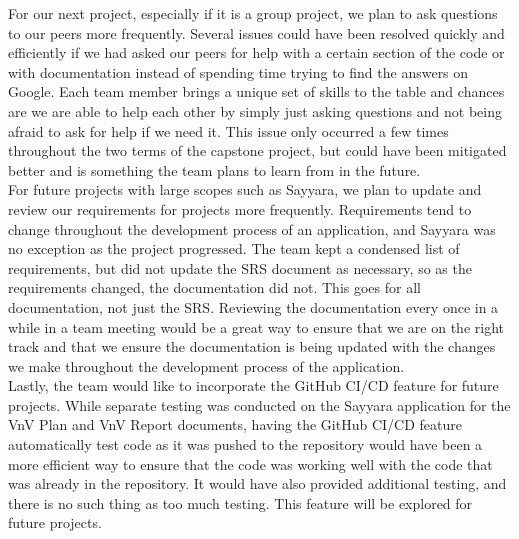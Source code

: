 \documentclass{article}
\begin{document}
\noindent For our next project, especially if it is a group project, we plan to ask questions to our peers more frequently. Several issues could have been
resolved quickly and efficiently if we had asked our peers for help with a certain section of the code or with documentation instead of spending time trying
to find the answers on Google. Each team member brings a unique set of skills to the table and chances are we are able to help each other by simply just
asking questions and not being afraid to ask for help if we need it. This issue only occurred a few times throughout the two terms of the capstone project,
but could have been mitigated better and is something the team plans to learn from in the future. \\

\noindent For future projects with large scopes such as Sayyara, we plan to update and review our requirements for projects more frequently. Requirements
tend to change throughout the development process of an application, and Sayyara was no exception as the project progressed. The team kept a condensed list
of requirements, but did not update the SRS document as necessary, so as the requirements changed, the documentation did not. This goes for all
documentation, not just the SRS. Reviewing the documentation every once in a while in a team meeting would be a great way to ensure that we are on the right
track and that we ensure the documentation is being updated with the changes we make throughout the development process of the application.\\

\noindent Lastly, the team would like to incorporate the GitHub CI/CD feature for future projects. While separate testing was conducted on the Sayyara
application for the VnV Plan and VnV Report documents, having the GitHub CI/CD feature automatically test code as it was pushed to the repository would have
been a more efficient way to ensure that the code was working well with the code that was already in the repository. It would have also provided additional
testing, and there is no such thing as too much testing. This feature will be explored for future projects.
\end{document}
